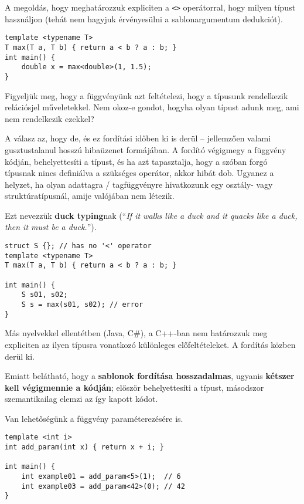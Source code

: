 \documentclass[a4paper, 11pt, oneside]{book}
\begin{document}
A megoldás, hogy meghatározzuk expliciten a \verb*|<>| operátorral, hogy milyen típust használjon (tehát nem hagyjuk érvényesülni a sablonargumentum dedukciót).

\begin{lstlisting}[style=cppstyle]
template <typename T>
T max(T a, T b) { return a < b ? a : b; }
int main() { 
	double x = max<double>(1, 1.5);
}
\end{lstlisting}

Figyeljük meg, hogy a függvényünk azt feltételezi, hogy a típusunk rendelkezik relációsjel műveletekkel. Nem okoz-e gondot, hogyha olyan típust adunk meg, ami nem rendelkezik ezekkel? 

A válasz az, hogy de, és ez fordítási időben ki is derül -- jellemzően valami gusztustalanul hosszú hibaüzenet formájában. A fordító végigmegy a függvény kódján, behelyettesíti a típust, és ha azt tapasztalja, hogy a szóban forgó típusnak nincs definiálva a szükséges operátor, akkor hibát dob. Ugyanez a helyzet, ha olyan adattagra / tagfüggvényre hivatkozunk egy osztály- vagy struktúratípusnál, amije valójában nem létezik.

Ezt nevezzük \textbf{duck typing}nak (``\textit{If it walks like a duck and it quacks like a duck, then it must be a duck.}'').

\begin{lstlisting}[style=cppstyle]
struct S {}; // has no '<' operator
template <typename T>
T max(T a, T b) { return a < b ? a : b; }
	
int main() { 
	S s01, s02;
	S s = max(s01, s02); // error
}
\end{lstlisting}

Más nyelvekkel ellentétben (Java, C\#), a C++-ban nem határozzuk meg expliciten az ilyen típusra vonatkozó különleges előfeltételeket. A fordítás közben derül ki.

Emiatt belátható, hogy a \textbf{sablonok fordítása hosszadalmas}, ugyanis \textbf{kétszer kell végigmennie a kódján}; először behelyettesíti a típust, másodszor szemantikailag elemzi az így kapott kódot.

Van lehetőségünk a függvény paraméterezésére is.

\begin{lstlisting}[style=cppstyle]
template <int i>
int add_param(int x) { return x + i; }

int main() {
	int example01 = add_param<5>(1);  // 6
	int example03 = add_param<42>(0); // 42
}
\end{lstlisting}
\end{document}
